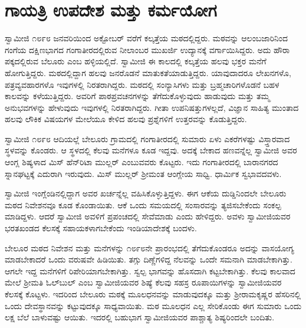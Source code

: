 
\chapter{ಗಾಯತ್ರಿ ಉಪದೇಶ ಮತ್ತು ಕರ್ಮಯೋಗ}

 ಸ್ವಾಮೀಜಿ ೧೮೯೮ ಜನವರಿಯಿಂದ ಅಕ್ಟೋಬರ್ ವರೆಗೆ ಕಲ್ಕತ್ತೆಯ ಮಠದಲ್ಲಿದ್ದರು. ಮಠವನ್ನು ಆಲಂಬಜಾರಿನಿಂದ ಗಂಗೆಯ ದಕ್ಷಿಣಭಾಗದ ಗಂಗಾತೀರದಲ್ಲಿರುವ ನೀಲಾಂಬರ ಮುಖರ್ಜಿ ಉದ್ಯಾನಕ್ಕೆ ವರ್ಗಾಯಿಸಿದ್ದರು. ಅದು ಹೌರಾ ಪಕ್ಕದಲ್ಲಿರುವ ಬೆಲೂರು ಎಂಬ ಹಳ್ಳಿಯಲ್ಲಿದೆ. ಸ್ವಾಮೀಜಿ ಈ ಕಾಲದಲ್ಲಿ ಕಲ್ಕತ್ತೆಯ ಹಲವು ಭಕ್ತರ ಮನೆಗೆ ಹೋಗುತ್ತಿದ್ದರು. ಮಠದಲ್ಲಿದ್ದಾಗ ಹಲವು ಜನರೊಡನೆ ಮಾತುಕತೆಯಾಡುತ್ತಿದ್ದರು. ಯಾವುದಾದರೂ ಲೇಖನಗಳೊ, ಪತ್ರವ್ಯವಹಾರಗಳೊ ಇವುಗಳಲ್ಲಿ ನಿರತರಾಗಿದ್ದರು. ಮಠದಲ್ಲಿ ಸಂನ್ಯಾಸಿಗಳು ಮತ್ತು ಬ್ರಹ್ಮಚಾರಿಗಳೊಡನೆ ಬಹಳ ಕಾಲವನ್ನು ಕಳೆಯುತ್ತಿದ್ದರು. ಅವರಿಗೆ ಪಾಠಪ್ರವಚನಗಳನ್ನು ತೆಗೆದುಕೊಳ್ಳುವುದು ಹಾಡುವುದು ಮತ್ತು ತಮ್ಮ ಅನುಭವಗಳನ್ನು ಹೇಳುವುದು ಇವುಗಳಲ್ಲಿ ನಿರತರಾಗಿದ್ದರು. ಗೀತಾ ಉಪನಿಷತ್ತುಗಳಲ್ಲದೆ, ವಿಜ್ಞಾನ ಸಾಹಿತ್ಯ ಮುಂತಾದ ಹಲವು ಲೌಕಿಕ ವಿಷಯಗಳ ಮೇಲೆಯೂ ಕೇಳಿದ ಹಲವು ಪ್ರಶ್ನೆಗಳಿಗೆ ಉತ್ತರವನ್ನು ಕೊಡುತ್ತಿದ್ದರು. 

 ಸ್ವಾಮೀಜಿ ೧೮೯೮ ಆದಿಯಲ್ಲೆ ಬೇಲೂರು ಗ್ರಾಮದಲ್ಲಿ ಗಂಗಾತೀರದಲ್ಲಿ ಸುಮಾರು ಏಳು ಎಕರೆಗಳಷ್ಟು ವಿಸ್ತ್ತಾರವಾದ ಸ್ಥಳವನ್ನು ಕೊಂಡರು. ಆ ಸ್ಥಳದಲ್ಲಿ ಕೆಲವು ಮನೆಗಳೂ ಕೂಡ ಇದ್ದವು. ಅದಕ್ಕೆ ಬೇಕಾದ ಹಣವನ್ನೆಲ್ಲ ಸ್ವಾಮೀಜಿ ಅವರ ಆಂಗ್ಲ ಶಿಷ್ಯಳಾದ ಮಿಸ್ ಹೆನ್‍ರಿಟಾ ಮುಲ್ಲರ್ ಎಂಬುವವರು ಕೊಟ್ಟರು. ಇದು ಗಂಗಾತೀರದಲ್ಲಿ ಬಾರಾನಗರದ ಸ್ನಾನಘಟ್ಟಕ್ಕೆ ಎದುರಾಗಿ ಇರುವುದು. ಮಿಸ್ ಮುಲ್ಲರ್ ಶ‍್ರೀಮಂತ ಆಂಗ್ಲೇಯ ಸಾಧ್ವಿ. ಧಾರ್ಮಿಕ ಸ್ವಭಾವದವಳು. 

 ಸ್ವಾಮೀಜಿ ಇಂಗ್ಲೆಂಡಿನಲ್ಲಿದ್ದಾಗ ಅವರ ಖರ್ಚನ್ನೆಲ್ಲ ವಹಿಸಿಕೊಳ್ಳುತ್ತಿದ್ದಳು. ಈಗ ಆಕೆಯ ದುಡ್ಡಿನಿಂದಲೇ‌ ಬೇಲೂರು ಮಠದ ನಿವೇಶನವೂ ಕೂಡ ಕೊಂಡಾಯಿತು. ಆಕೆ ಒಂದು ಸಮಯದಲ್ಲಿ ಸಂಸಾರವನ್ನು ತ್ಯಜಿಸಬೇಕೆಂದು ಸಂಕಲ್ಪ ಮಾಡಿದ್ದಳು. ಆದರೆ ಸ್ವಾಮೀಜಿ ಅವಳಿಗೆ ಪ್ರಪಂಚದಲ್ಲಿ ಸೇವೆಮಾಡು ಎಂದು ಹೇಳಿದ್ದರು. ಅವಳು ಸ್ವಾಮೀಜಿಯವರ ಭರತಖಂಡದ ಕೆಲಸಕ್ಕೆ ಸಹಾಯಕಳಾಗಬೇಕೆಂದು ಇಂಡಿಯಾದೇಶಕ್ಕೆ ಬಂದಳು. 

 ಬೇಲೂರ ಮಠದ ನಿವೇಶನ ಮತ್ತು ಮನೆಗಳನ್ನು ೧೮೯೮ನೇ ಪ್ರಾರಂಭದಲ್ಲಿ ತೆಗೆದುಕೊಂಡರೂ ಅದನ್ನು ವಾಸಯೋಗ್ಯ ಮಾಡಬೇಕಾದರೆ ಒಂದು ವರುಷವೇ ಹಿಡಿಯಿತು. ತಗ್ಗು ದಿಣ್ಣೆಗಳಿದ್ದ ನೆಲವನ್ನು ಒಂದೇ ಸಮನಾಗಿ ಮಾಡಬೇಕಾಗಿತ್ತು. ಆಗಲೇ ಇದ್ದ ಮನೆಗಳಿಗೆ ರಿಪೇರಿಯಾಗಬೇಕಾಗಿತ್ತು. ಸ್ವಲ್ಪ ಭಾಗವನ್ನು ಹೊಸದಾಗಿ ಕಟ್ಟಬೇಕಾಗಿತ್ತು. ಕೆಲವು ಕಾಲವಾದ ಮೇಲೆ ಶ‍್ರೀಮತಿ ಓಲ್‍ಬುಲ್ ಎಂಬ ಸ್ವಾಮೀಜಿಯವರ ಶಿಷ್ಯೆ ಕೆಲವು ಸಹಸ್ರ ರೂಪಾಯಿಗಳನ್ನು ಸ್ವಾಮೀಜಿಯವರ ಕೆಲಸಕ್ಕೆ ಕೊಟ್ಟಳು. ಇದರಿಂದ ಬೇಲೂರು ಮಠಕ್ಕೆ ಮೂಲಧನವನ್ನು ಮಾಡುವುದಕ್ಕೂ ಮತ್ತು ಶ‍್ರೀರಾಮಕೃಷ್ಣರ ಹೆಸರಿನಲ್ಲಿ ಒಂದು ದೇವಸ್ಥಾನವನ್ನು ಕಟ್ಟುವುದಕ್ಕೂ ಸಾಧ್ಯವಾಯಿತು. ಮಠ ಮೂಲಧನ ಎಲ್ಲ ಸೇರಿಕೊಂಡು ಈಗ ಸುಮಾರು ಒಂದು ಲಕ್ಷ ಬೆಲೆ ಬಾಳುವಷ್ಟು ಆಯಿತು. ಇದರಲ್ಲಿ ಬಹುಭಾಗ ಸ್ವಾಮೀಜಿಯವರ ಪಾಶ್ಚಾತ್ಯ ಶಿಷ್ಯರಿಂದಲೇ ಬಂದಿತು. 

